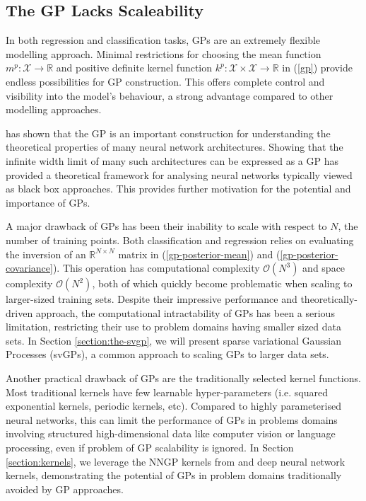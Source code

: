 \documentclass{article}
\numberwithin{equation}{section}
\begin{document}
\subsection{The GP Lacks Scaleability}\label{section:gp-problems}
In both regression and classification tasks, GPs are an extremely flexible modelling approach. Minimal restrictions for choosing the mean function $m^p: \mathcal{X} \rightarrow \mathbb{R}$ and positive definite kernel function $k^p: \mathcal{X} \times \mathcal{X} \rightarrow \mathbb{R}$ in (\ref{gp}) provide endless possibilities for GP construction. This offers complete control and visibility into the model's behaviour, a strong advantage compared to other modelling approaches. 

\cite{novak2019neural} has shown that the GP is an important construction for understanding the theoretical properties of many neural network architectures. Showing that the infinite width limit of many such architectures can be expressed as a GP has provided a theoretical framework for analysing neural networks typically viewed as black box approaches. This provides further motivation for the potential and importance of GPs.

A major drawback of GPs has been their inability to scale with respect to $N$, the number of training points. Both classification and regression relies on evaluating the inversion of an $\mathbb{R}^{N \times N}$ matrix in (\ref{gp-posterior-mean}) and (\ref{gp-posterior-covariance}). This operation has computational complexity $\mathcal{O}(N^3)$ and space complexity $\mathcal{O}(N^2)$, both of which quickly become problematic when scaling to larger-sized training sets. Despite their impressive performance and theoretically-driven approach, the computational intractability of GPs has been a serious limitation, restricting their use to problem domains having smaller sized data sets. In Section \ref{section:the-svgp}, we will present sparse variational Gaussian Processes (svGPs), a common approach to scaling GPs to larger data sets.

Another practical drawback of GPs are the traditionally selected kernel functions. Most traditional kernels have few learnable hyper-parameters (i.e. squared exponential kernels, periodic kernels, etc). Compared to highly parameterised neural networks, this can limit the performance of GPs in problems domains involving structured high-dimensional data like computer vision or language processing, even if problem of GP scalability is ignored. In Section \ref{section:kernels}, we leverage the NNGP kernels from \cite{novak2019neural} and deep neural network kernels, demonstrating the potential of GPs in problem domains traditionally avoided by GP approaches.
\end{document}
